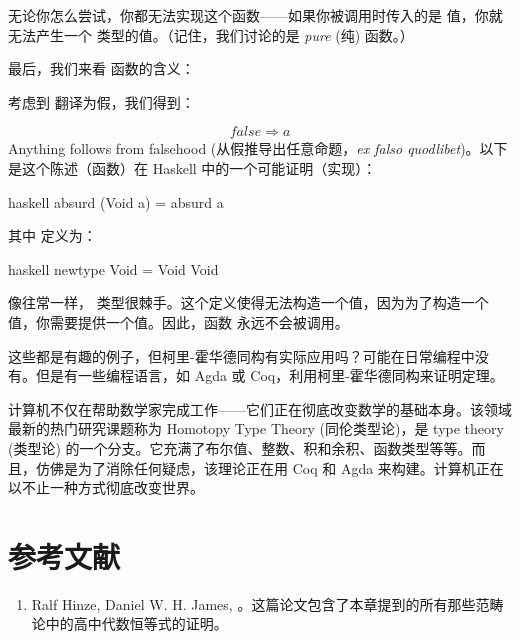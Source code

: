 无论你怎么尝试，你都无法实现这个函数——如果你被调用时传入的是  值，你就无法产生一个  类型的值。（记住，我们讨论的是 \emph{pure} (纯) 函数。）

最后，我们来看  函数的含义：

考虑到  翻译为假，我们得到：

\[\mathit{false} \Rightarrow a\]
Anything follows from falsehood (从假推导出任意命题，\emph{ex falso quodlibet})。以下是这个陈述（函数）在 Haskell 中的一个可能证明（实现）：

\begin{snip}{haskell}
absurd (Void a) = absurd a
\end{snip}
其中  定义为：

\begin{snip}{haskell}
newtype Void = Void Void
\end{snip}
像往常一样， 类型很棘手。这个定义使得无法构造一个值，因为为了构造一个值，你需要提供一个值。因此，函数  永远不会被调用。

这些都是有趣的例子，但柯里-霍华德同构有实际应用吗？可能在日常编程中没有。但是有一些编程语言，如 Agda 或 Coq，利用柯里-霍华德同构来证明定理。

计算机不仅在帮助数学家完成工作——它们正在彻底改变数学的基础本身。该领域最新的热门研究课题称为 Homotopy Type Theory (同伦类型论)，是 type theory (类型论) 的一个分支。它充满了布尔值、整数、积和余积、函数类型等等。而且，仿佛是为了消除任何疑虑，该理论正在用 Coq 和 Agda 来构建。计算机正在以不止一种方式彻底改变世界。

\section{参考文献}

\begin{enumerate}
  \tightlist
  \item
        Ralf Hinze, Daniel W. H. James,
        。这篇论文包含了本章提到的所有那些范畴论中的高中代数恒等式的证明。
\end{enumerate}